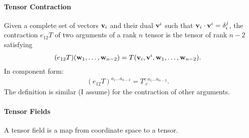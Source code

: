 \paragraph{Tensor Contraction}
Given a complete set of vectors $\vb{v}_{i}$ and their dual $\vb{v}^{i}$ such that $\vb{v}_{i}\cdot\vb{v}^{i} = \delta_{i}^{j}$, the contraction $e_{12}T$ of two arguments of a rank $n$ tensor is the tensor of rank $n - 2$ satisfying
\begin{align*}
	(e_{12}T)(\vb{w}_{1}, \dots, \vb{w}_{n - 2}) = T(\vb{v}_{i}, \vb{v}^{i}, \vb{w}_{1}, \dots, \vb{w}_{n - 2}).
\end{align*}
In component form:
\begin{align*}
	(e_{12}T)^{a_{1}\dots a_{n - 2}} = T^{c\;a_{1}\dots a_{n - 2}}_{\;c}.
\end{align*}
The definition is similar (I assume) for the contraction of other arguments.

\paragraph{Tensor Fields}
A tensor field is a map from coordinate space to a tensor.